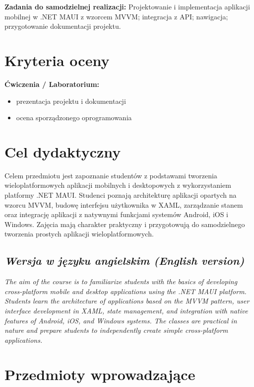 \documentclass[12pt, a4paper]{article}
\begin{document}
\vspace{4pt}
\noindent\textbf{Zadania do samodzielnej realizacji:} Projektowanie i implementacja aplikacji mobilnej w .NET MAUI z wzorcem MVVM; integracja z API; nawigacja; przygotowanie dokumentacji projektu.

\section{Kryteria oceny}

\textbf{Ćwiczenia / Laboratorium:}
\begin{itemize}
  \item prezentacja projektu i dokumentacji
  \item ocena sporządzonego oprogramowania
\end{itemize}


\section{Cel dydaktyczny}

Celem przedmiotu jest zapoznanie studentów z podstawami tworzenia wieloplatformowych aplikacji mobilnych i desktopowych z wykorzystaniem platformy .NET MAUI. Studenci poznają architekturę aplikacji opartych na wzorcu MVVM, budowę interfejsu użytkownika w XAML, zarządzanie stanem oraz integrację aplikacji z natywnymi funkcjami systemów Android, iOS i Windows. Zajęcia mają charakter praktyczny i przygotowują do samodzielnego tworzenia prostych aplikacji wieloplatformowych.

\subsection*{\textit{Wersja w języku angielskim (English version)}}

\textit{The aim of the course is to familiarize students with the basics of developing cross-platform mobile and desktop applications using the .NET MAUI platform. Students learn the architecture of applications based on the MVVM pattern, user interface development in XAML, state management, and integration with native features of Android, iOS, and Windows systems. The classes are practical in nature and prepare students to independently create simple cross-platform applications.}


\section{Przedmioty wprowadzające}
\end{document}
